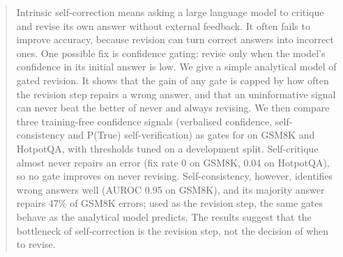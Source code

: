 \begin{abstract}
Intrinsic self-correction means asking a large language model to critique and revise its own answer without external feedback. It often fails to improve accuracy, because revision can turn correct answers into incorrect ones. One possible fix is confidence gating: revise only when the model's confidence in its initial answer is low. We give a simple analytical model of gated revision. It shows that the gain of any gate is capped by how often the revision step repairs a wrong answer, and that an uninformative signal can never beat the better of never and always revising. We then compare three training-free confidence signals (verbalised confidence, self-consistency and P(True) self-verification) as gates for \modelA{} on GSM8K and HotpotQA, with thresholds tuned on a development split. Self-critique almost never repairs an error (fix rate 0 on GSM8K, 0.04 on HotpotQA), so no gate improves on never revising. Self-consistency, however, identifies wrong answers well (AUROC 0.95 on GSM8K), and its majority answer repairs 47\% of GSM8K errors; used as the revision step, the same gates behave as the analytical model predicts. The results suggest that the bottleneck of self-correction is the revision step, not the decision of when to revise.
\end{abstract}
